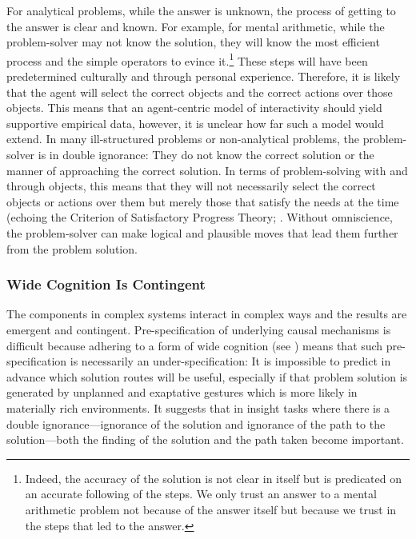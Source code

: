 \documentclass{article}
\begin{document}
For analytical problems, while the answer is unknown, the process of getting to the answer is clear and known. For example, for mental arithmetic, while the problem-solver may not know the solution, they will know the most efficient process and the simple operators to evince it.\footnote{Indeed, the accuracy of the solution is not clear in itself but is predicated on an accurate following of the steps. We only trust an answer to a mental arithmetic problem not because of the answer itself but because we trust in the steps that led to the answer.

} These steps will have been predetermined culturally and through personal experience. Therefore, it is likely that the agent will select the correct objects and the correct actions over those objects. This means that an agent-centric model of interactivity should yield supportive empirical data, however, it is unclear how far such a model would extend. In many ill-structured problems or non-analytical problems, the problem-solver is in double ignorance: They do not know the correct solution or the manner of approaching the correct solution. In terms of problem-solving with and through objects, this means that they will not necessarily select the correct objects or actions over them but merely those that satisfy the needs at the time (echoing the Criterion of Satisfactory Progress Theory; \parencite{MacGregor2001, Ormerod2013}. Without omniscience, the problem-solver can make logical and plausible moves that lead them further from the problem solution. 

\subsubsection{Wide Cognition Is Contingent}

The components in complex systems interact in complex ways and the results are emergent and contingent. Pre-specification of underlying causal mechanisms is difficult because adhering to a form of wide cognition (see \parencite{Wilson2009}) means that such pre-specification is necessarily an under-specification: It is impossible to predict in advance which solution routes will be useful, especially if that problem solution is generated by unplanned and exaptative gestures which is more likely in materially rich environments. It suggests that in insight tasks where there is a double ignorance—ignorance of the solution and ignorance of the path to the solution—both the finding of the solution and the path taken become important. 
\end{document}
